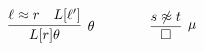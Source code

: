 
\begin{gather*}
    \infer[\theta]
        {L[r]\theta}
        {\ell\mEQ r & L[\ell']}
        \qquad\qquad
        \infer[\mu]
        {\emptyclause}
        {s\mNE t}
\end{gather*}